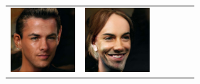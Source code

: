 \documentclass{article}
\newcommand{\pganw}{0.95in}
\begin{document}
\begin{table}[htbp]
\begin{center}
\begin{tabular}{cc|cc|cc}
\includegraphics[width=\pganw]{figures/pgan/53_base_iso_reject.jpg} &
\includegraphics[width=\pganw]{figures/pgan/52_base_iso_MH.jpg} &

\end{tabular}
\end{center}
\end{table}
\end{document}
